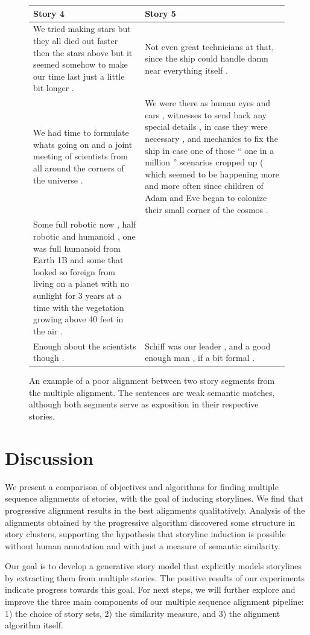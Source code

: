 \documentclass{article}
\begin{document}
\begin{figure}[h]
\centering
\small
\begin{tabular}{|p{}|p{}|}
\hline
\textbf{Story 4} & \textbf{Story 5}
\\
\hline
We tried making stars but they all died out faster then the stars above but it seemed somehow to make our time last just a little bit longer .
& Not even great technicians at that, since the ship could handle damn near everything itself .
\\
\hline
We had time to formulate whats going on and a joint meeting of scientists from all around the corners of the universe .
& We were there as human eyes and ears , witnesses to send back any special details , in case they were necessary , and mechanics to fix the ship in case one of those “ one in a million ” scenarios cropped up ( which seemed to be happening more and more often since children of Adam and Eve began to colonize their small corner of the cosmos .
\\
\hline
Some full robotic now , half robotic and humanoid , one was full humanoid from Earth 1B and some that looked so foreign from living on a planet with no sunlight for 3 years at a time with the vegetation growing above 40 feet in the air .
& \\
\hline
Enough about the scientists though .
& Schiff was our leader , and a good enough man , if a bit formal .
\\
\hline
\end{tabular}
\caption{
\label{fig:bad-alignment}
An example of a poor alignment between two story segments from the multiple alignment.
The sentences are weak semantic matches, although both segments
serve as exposition in their respective stories.
}
\end{figure}

\section{Discussion}
We present a comparison of objectives and algorithms for finding
multiple sequence alignments of stories,
with the goal of inducing storylines.
We find that progressive alignment results in the best alignments qualitatively.
Analysis of the alignments obtained by the progressive algorithm
discovered some structure in story clusters,
supporting the hypothesis that storyline induction is possible without human annotation
and with just a measure of semantic similarity.

Our goal is to develop a generative story model that explicitly models storylines
by extracting them from multiple stories.
The positive results of our experiments indicate progress towards this goal.
For next steps, we will further explore and improve the three main components of
our multiple sequence alignment pipeline:
1) the choice of story sets, 2) the similarity measure, and 3) the alignment algorithm itself.
\end{document}
